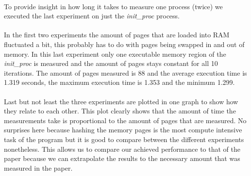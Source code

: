 \paragraph*{}%
To provide insight in how long it takes to measure one process (twice) we executed the last experiment on just the \textit{init\_proc} process.


\paragraph*{}%
In the first two experiments the amount of pages that are loaded into RAM fluctuated a bit, this probably has to do with pages being swapped in and out of memory. In this last experiment only one executable memory region of the \textit{init\_proc} is measured and the amount of pages stays constant for all 10 iterations. The amount of pages measured is 88 and the average execution time is 1.319 seconds, the maximum execution time is 1.353 and the minimum 1.299.

\paragraph*{}
Last but not least the three experiments are plotted in one graph to show how they relate to each other. This plot clearly shows that the amount of time the measurements take is proportional to the amount of pages that are measured. No surprises here because hashing the memory pages is the most compute intensive task of the program but it is good to compare between the different experiments nonetheless. This allows us to compare our achieved performance to that of the paper because we can extrapolate the results to the necessary amount that was measured in the paper.

